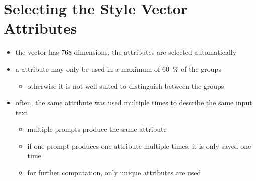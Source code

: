 \section{Selecting the Style Vector Attributes}
\label{sec:approach:selection}

\begin{itemize}
  \item the vector has 768 dimensions, the attributes are selected automatically
  \item a attribute may only be used in a maximum of \SI{60}{\percent} of the groups
        \begin{itemize}
          \item otherwise it is not well suited to distinguish between the groups
        \end{itemize}
  \item often, the same attribute was used multiple times to describe the same input text
        \begin{itemize}
          \item multiple prompts produce the same attribute
          \item if one prompt produces one attribute multiple times, it is only saved one time
          \item for further computation, only unique attributes are used
        \end{itemize}
\end{itemize}